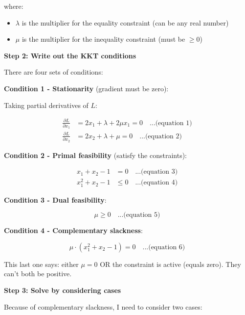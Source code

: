 \documentclass[11pt]{article}
\begin{document}
where:
\begin{itemize}
\item $\lambda$ is the multiplier for the equality constraint (can be any real number)
\item $\mu$ is the multiplier for the inequality constraint (must be $\geq 0$)
\end{itemize}

\vspace{1em}

\textbf{Step 2: Write out the KKT conditions}

There are four sets of conditions:

\textbf{Condition 1 - Stationarity} (gradient must be zero):

Taking partial derivatives of $L$:

\begin{align*}
\frac{\partial L}{\partial x_1} &= 2x_1 + \lambda + 2\mu x_1 = 0 \quad \text{...(equation 1)}\\
\frac{\partial L}{\partial x_2} &= 2x_2 + \lambda + \mu = 0 \quad \text{...(equation 2)}
\end{align*}

\textbf{Condition 2 - Primal feasibility} (satisfy the constraints):

\begin{align*}
x_1 + x_2 - 1 &= 0 \quad \text{...(equation 3)}\\
x_1^2 + x_2 - 1 &\leq 0 \quad \text{...(equation 4)}
\end{align*}

\textbf{Condition 3 - Dual feasibility}:

\begin{equation*}
\mu \geq 0 \quad \text{...(equation 5)}
\end{equation*}

\textbf{Condition 4 - Complementary slackness}:

\begin{equation*}
\mu \cdot (x_1^2 + x_2 - 1) = 0 \quad \text{...(equation 6)}
\end{equation*}

This last one says: either $\mu = 0$ OR the constraint is active (equals zero). They can't both be positive.

\vspace{1em}

\textbf{Step 3: Solve by considering cases}

Because of complementary slackness, I need to consider two cases:
\end{document}
